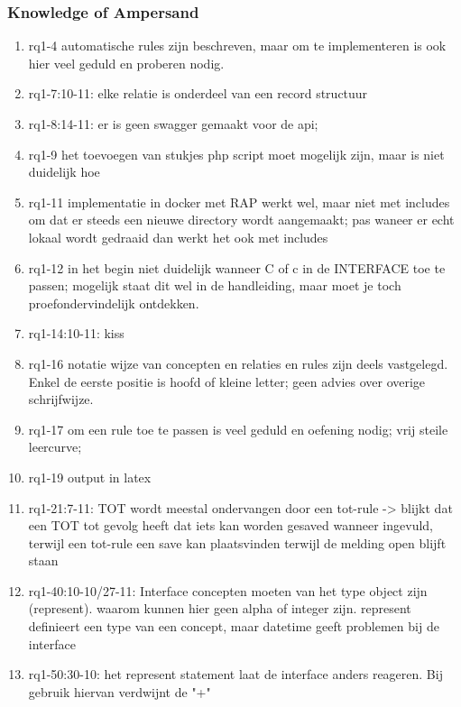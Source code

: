 \subsubsection{Knowledge of Ampersand}
\begin{comment}
- wat zijn de exacte waarnemingen geweest!
plaats hier de afgehandelde items.
\end{comment}
\begin{enumerate}
    \item rq1-4 automatische rules zijn beschreven, maar om te implementeren is ook hier veel geduld en proberen nodig. 
    \item rq1-7:10-11: elke relatie is onderdeel van een record structuur
    \item rq1-8:14-11: er is geen swagger gemaakt voor de api; 
    \item rq1-9 het toevoegen van stukjes php script moet mogelijk zijn, maar is niet duidelijk hoe
    \item rq1-11 implementatie in docker met RAP werkt wel, maar niet met includes om dat er steeds een nieuwe directory wordt aangemaakt; pas waneer er echt lokaal wordt gedraaid dan werkt het ook met includes
    \item rq1-12 in het begin niet duidelijk wanneer C of c in de INTERFACE toe te passen; mogelijk staat dit wel in de handleiding, maar moet je toch proefondervindelijk ontdekken.
    \item rq1-14:10-11: kiss
    \item rq1-16 notatie wijze van concepten en relaties en rules zijn deels vastgelegd. Enkel de eerste positie is hoofd of kleine letter; geen advies over overige schrijfwijze.
    \item rq1-17 om een rule toe te passen is veel geduld en oefening nodig; vrij steile leercurve; 
    \item rq1-19 output in latex 
    \item rq1-21:7-11: TOT wordt meestal ondervangen door een tot-rule -> blijkt dat een TOT tot gevolg heeft dat iets kan worden gesaved wanneer ingevuld, terwijl een tot-rule een save kan plaatsvinden terwijl de melding open blijft staan
    \item rq1-40:10-10/27-11: Interface concepten moeten van het type object zijn (represent). waarom kunnen hier geen alpha of integer zijn.
    represent definieert een type van een concept, maar datetime geeft problemen bij de interface
    \item rq1-50:30-10: het represent statement laat de interface anders reageren. Bij gebruik hiervan verdwijnt de "+"

\end{enumerate}
